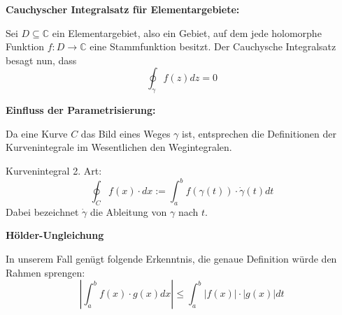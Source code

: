 \documentclass[12pt]{amsart}
\begin{document}
\bigskip

\textbf{Cauchyscher Integralsatz für Elementargebiete:}

\smallskip

Sei $D \subseteq \mathbb{C}$ ein Elementargebiet, also ein Gebiet, auf dem jede holomorphe Funktion $f: D \rightarrow \mathbb{C}$ eine Stammfunktion besitzt. Der Cauchysche Integralsatz besagt nun, dass $$\oint_\gamma f(z) dz = 0$$

\bigskip

\textbf{Einfluss der Parametrisierung:} 

\smallskip

Da eine Kurve $C$ das Bild eines Weges $\gamma$ ist, entsprechen die Definitionen der Kurvenintegrale im Wesentlichen den Wegintegralen. 

\smallskip

Kurvenintegral 2. Art:$$\oint_C f(x) \cdot dx := \int_a^b f(\gamma(t)) \cdot \dot{\gamma}(t) dt$$ Dabei bezeichnet $\dot{\gamma}$ die Ableitung von $\gamma$ nach $t$.

\bigskip

\textbf{Hölder-Ungleichung}

\smallskip

In unserem Fall genügt folgende Erkenntnis, die genaue Definition würde den Rahmen sprengen: $$\left| \int_a^b f(x) \cdot g(x) dx\right| \leq \int_a^b \left|f(x)\right| \cdot \left|g(x)\right| dt$$
\end{document}
